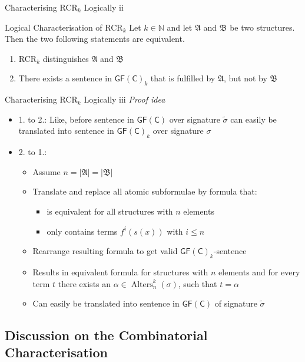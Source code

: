 \documentclass[aspectratio=169]{beamer}
\newcommand{\GFC}{\mathsf{GF}(\mathsf{C})}
\begin{document}
	\begin{frame}{Characterising RCR$_k$ Logically ii}
		\begin{block}{Logical Characterisation of RCR$_k$}
			Let $k\in\mathbb N$ and let $\mathfrak A$ and $\mathfrak B$ be two structures.
			Then the two following statements are equivalent.
			\begin{enumerate}
				\item RCR$_k$ distinguishes $\mathfrak A$ and $\mathfrak B$
				\item There exists a sentence in $\GFC_k$ that is fulfilled by $\mathfrak A$, but not by $\mathfrak B$
			\end{enumerate}
		\end{block}
	\end{frame}
	
	\begin{frame}{Characterising RCR$_k$ Logically iii}
		\emph{Proof idea}
		\begin{itemize}
			\item 1. to 2.: Like, before sentence in $\GFC$ over signature $\widetilde{\sigma}$ can easily be translated into sentence in $\GFC_k$ over signature $\sigma$
			\item 2. to 1.:
			\begin{itemize}
				\item Assume $n=\vert \mathfrak A \vert = \vert \mathfrak B \vert$
				\item Translate and replace all atomic subformulae by formula that:
				\begin{itemize}
					\item is equivalent for all structures with $n$ elements
					\item only contains terms $f^i(s(x))$ with $i\leq n$
				\end{itemize}
				\item Rearrange resulting formula to get valid $\GFC_k$-sentence
				\item Results in equivalent formula for structures with $n$ elements and for every term $t$ there exists an $\alpha\in\operatorname{Alters}^k_n(\sigma)$, such that $t=\alpha$
				\item Can easily be translated into sentence in $\GFC$ of signature $\widetilde{\sigma}$
			\end{itemize}
		\end{itemize}
	\end{frame}
	
	\subsection{Discussion on the Combinatorial Characterisation}
	
\end{document}
